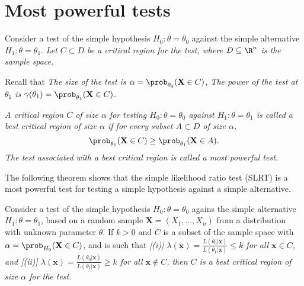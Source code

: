 \section{Most powerful tests} 
Consider a test of the simple hypothesis $H_0:\theta=\theta_0$ against the simple alternative $H_1:\theta=\theta_1$.
\bit
\it Let $C\subset D$ be a critical region for the test, where $D\subseteq\R^n$ is the sample space.
\eit

\vspace*{2ex}
Recall that 
\bit
\it The \emph{size} of the test is $\alpha = \prob_{\theta_0}(\mathbf{X}\in C)$,
\it The \emph{power} of the test at $\theta_1$ is $\gamma(\theta_1) = \prob_{\theta_1}(\mathbf{X}\in C)$. 
\eit

\begin{definition}
\ben
\it A critical region $C$ of size $\alpha$ for testing $H_0:\theta=\theta_0$ against $H_1:\theta=\theta_1$ is called a \emph{best critical region} of size $\alpha$ if for every subset $A\subset D$ of size $\alpha$,
\[
\prob_{\theta_1}(\mathbf{X}\in C) \geq \prob_{\theta_1}(\mathbf{X}\in A).
\]
\it The test associated with a best critical region is called a \emph{most powerful test}.
\een
\end{definition}


\vspace*{2ex}
The following theorem shows that the simple likelihood ratio test (SLRT) is a most powerful test for testing a simple hypothesis against a simple alternative.

%

\begin{theorem}
Consider a test of the simple hypothesis $H_0:\theta=\theta_0$ agains the simple alternative $H_1:\theta=\theta_1$, based on a random sample $\mathbf{X}=(X_1,\ldots,X_n)$ from a distribution with unknown parameter $\theta$. If $k>0$ and $C$ is a subset of the sample space with $\alpha = \prob_{H_0}(\mathbf{X}\in C)$, and is such that
\bit
\it[(i)]  $\displaystyle \lambda(\mathbf{x}) = \frac{L(\theta_0|\mathbf{x})}{L(\theta_1|\mathbf{x})} \leq k$ for all $\mathbf{x}\in C$, and
\it[(ii)] $\displaystyle \lambda(\mathbf{x}) = \frac{L(\theta_0|\mathbf{x})}{L(\theta_1|\mathbf{x})} \geq k$ for all $\mathbf{x}\notin C$,
\eit
then $C$ is a best critical region of size $\alpha$ for the test.
\end{theorem}

